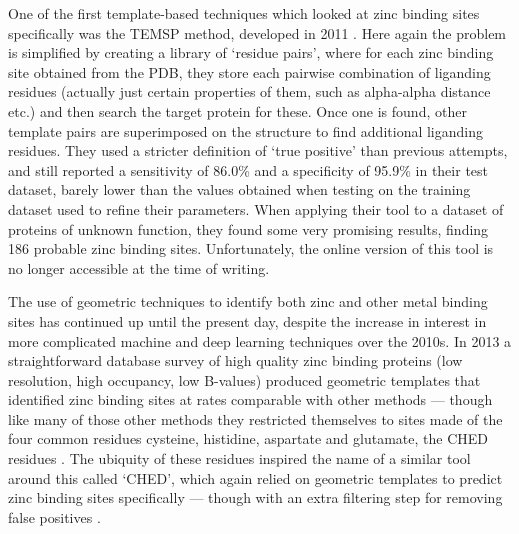 One of the first template-based techniques which looked at zinc binding sites specifically was the TEMSP method, developed in 2011 \cite{zhao2011structure}. Here again the problem is simplified by creating a library of `residue pairs', where for each zinc binding site obtained from the PDB, they store each pairwise combination of liganding residues (actually just certain properties of them, such as alpha-alpha distance etc.) and then search the target protein for these. Once one is found, other template pairs are superimposed on the structure to find additional liganding residues. They used a stricter definition of `true positive' than previous attempts, and still reported a sensitivity of 86.0\% and a specificity of 95.9\% in their test dataset, barely lower than the values obtained when testing on the training dataset used to refine their parameters. When applying their tool to a dataset of proteins of unknown function, they found some very promising results, finding 186 probable zinc binding sites. Unfortunately, the online version of this tool is no longer accessible at the time of writing.

The use of geometric techniques to identify both zinc and other metal binding sites has continued up until the present day, despite the increase in interest in more complicated machine and deep learning techniques over the 2010s. In 2013 a straightforward database survey of high quality zinc binding proteins (low resolution, high occupancy, low B-values) produced geometric templates that identified zinc binding sites at rates comparable with other methods --- though like many of those other methods they restricted themselves to sites made of the four common residues cysteine, histidine, aspartate and glutamate, the CHED residues \cite{liu2014}. The ubiquity of these residues inspired the name of a similar tool around this called `CHED', which again relied on geometric templates to predict zinc binding sites specifically --- though with an extra filtering step for removing false positives \cite{sobolev2013web}.


